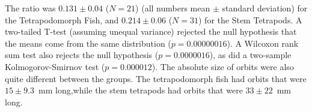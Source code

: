 The ratio was $0.131 \pm 0.04$  ($N=21$) (all numbers mean $\pm$ standard deviation) for the Tetrapodomorph Fish, and $0.214 \pm  0.06$ ($N=31$) for the Stem Tetrapods. A two-tailed  T-test (assuming unequal variance) rejected the null hypothesis that the means come from the same distribution ($p = 0.00000016$). A Wilcoxon rank sum test also rejects the null hypothesis ($p = 0.0000016$), as did a two-sample Kolmogorov-Smirnov test ($p = 0.000012$).  The absolute size of orbits were also quite different between the groups. The tetrapodomorph fish had orbits that were $15 \pm 9.3$~mm long,while the stem tetrapods had orbits that were $33 \pm 22$~mm long.